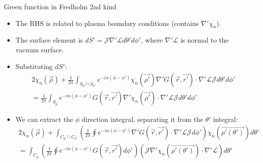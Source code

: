 \documentclass[8pt]{beamer}
\begin{document}
\begin{frame}{\color{white} Green function in Fredholm 2nd kind}
\begin{itemize}
    \item The RHS is related to plasma boundary conditions (contains $\nabla' \chi_n$).
    \item The surface element is $dS' = \mathcal{J} \nabla'\mathcal{L} d \theta' d\phi'$, where $\nabla'\mathcal{L}$ is normal to the vacuum surface.
    \item Substituting $dS'$:
    \begin{align}
         2 \chi_n(\vec\rho) +\frac{1}{2\pi}\int_{S_p \cap S_C} e^{-in(\phi - \phi')}  \chi_n(\vec{\rho'}) \nabla' G(\vec{r},\vec{r'}) \cdot  \nabla'\mathcal{L} \mathcal{J}d \theta' d\phi' \nonumber \\
         = \frac{1}{2\pi} \int_{S_p} e^{-in(\phi - \phi')} G(\vec{r},\vec{r'}) \nabla' \chi_n(\vec{\rho'}) \cdot \nabla'\mathcal{L} \mathcal{J}d \theta' d\phi' \label{eq:fredholm_2nd_kind_results}
    \end{align}
    \item We can extract the $\phi$ direction integral, separating it from the $\theta'$ integral:
    \begin{align}
         2 \chi_n(\vec\rho) +\int_{C_p \cap C_C} \left(\frac{1}{2\pi}\oint e^{-in(\phi - \phi')} \nabla' G(\vec{r},\vec{r'}) \cdot  \nabla'\mathcal{L} \mathcal{J} d\phi' \right) \chi_n(\vec{\rho'(\theta')}) d \theta' \nonumber \\
         = \int_{C_p} \left( \frac{1}{2\pi} \oint e^{-in(\phi - \phi')} G(\vec{r},\vec{r'})  d\phi'\right) \left(\mathcal{J}\nabla' \chi_n(\vec{\rho'(\theta')}) \cdot \nabla'\mathcal{L} \right)d \theta' \label{eq:21-2}
    \end{align}
\end{itemize}
\end{frame}
\end{document}
